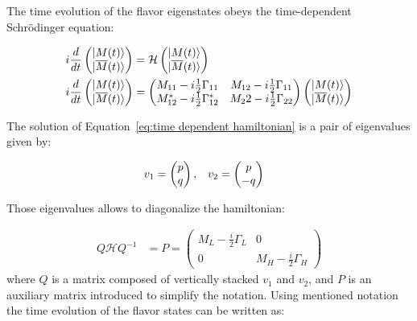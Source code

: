 The time evolution of the flavor eigenstates obeys the time-dependent Schr\"{o}dinger equation:

\begin{align}
\label{eq:time dependent hamiltonian}
\centering
    i\frac{d}{dt} \left(\begin{matrix} \ket{M(t)}  \\ \ket{\overline{M}(t)} \end{matrix}  \right) 
    &= \mathcal{H} \left(\begin{matrix} \ket{M(t)}  \\ \ket{\overline{M}(t)} \end{matrix}  \right) \\
    i\frac{d}{dt} \left(\begin{matrix} \ket{M(t)}  \\ \ket{\overline{M}(t)} \end{matrix}  \right) 
    &=\left( \begin{matrix} M_{11} - i\frac{1}{2}\Gamma_{11} & M_{12} -i\frac{1}{2}\Gamma_{11} \\ M_{12}^{*} - i\frac{1}{2}\Gamma_{12}^{*} & M_22-i\frac{1}{2}\Gamma_{22} \end{matrix} \right) \left(\begin{matrix} \ket{M(t)}  \\ \ket{\overline{M}(t)} \end{matrix}  \right) 
\end{align}

The solution of Equation~\ref{eq:time dependent hamiltonian} is a pair of eigenvalues given by:

\begin{align}
\centering
    v_{1} &= \left( \begin{matrix} p  \\ q \end{matrix} \right), & 
    v_{2} &=  \left( \begin{matrix} p \\ -q \end{matrix} \right) 
\end{align}

Those eigenvalues allows to diagonalize the hamiltonian: 

\begin{align}
   Q\mathcal{H}Q^{-1} &= P =  \left( \begin{matrix} M_{L} - \frac{i}{2}\Gamma_{L} & 0  \\ 0 &  M_{H} - \frac{i}{2}\Gamma_{H}  \end{matrix} \right) 
\end{align}
where $Q$ is a matrix composed of vertically stacked $v_1$ and $v_2$, and $P$ is an auxiliary matrix introduced to simplify the notation. 
Using mentioned notation the time evolution of the flavor states can be written as:

